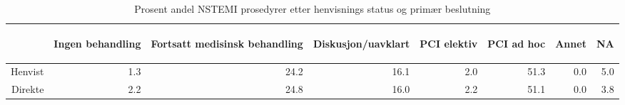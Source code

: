 \documentclass[presentation,xcolor=pdftex,dvipsnames,table]{beamer}
\begin{document}
\begin{frame}
\begin{tiny}
\begin{table}[ht]
\centering
\begin{tabular}{rrrrrrrr}
  \toprule
 & \begin{sideways} Ingen behandling \end{sideways} & \begin{sideways} Fortsatt medisinsk behandling \end{sideways} & \begin{sideways} Diskusjon/uavklart \end{sideways} & \begin{sideways} PCI elektiv \end{sideways} & \begin{sideways} PCI ad hoc \end{sideways} & \begin{sideways} Annet \end{sideways} & \begin{sideways} NA \end{sideways} \\ 
  \midrule
Henvist & 1.3 & 24.2 & 16.1 & 2.0 & 51.3 & 0.0 & 5.0 \\ 
  Direkte & 2.2 & 24.8 & 16.0 & 2.2 & 51.1 & 0.0 & 3.8 \\ 
   \bottomrule
\end{tabular}
\caption{Prosent andel NSTEMI prosedyrer etter henvisnings status og primær beslutning} 
\end{table}\end{tiny}
\end{frame}
\end{document}
